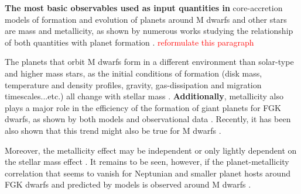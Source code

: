 \documentclass[structabstract]{aa}
\begin{document}
\textbf{The most basic observables used as input quantities in} core-accretion models of formation and evolution of planets around M dwarfs and other stars are mass and metallicity, as shown by numerous works studying the relationship of both quantities with planet formation \citep[e.g.][]{Ida-2005,Kornet-2006, Kennedy-2008a, Thommes-2008, Alibert-2011, Mordasini-2012}. \textcolor{red}{reformulate this paragraph }

The planets that orbit M dwarfs form in a different environment than solar-type and higher mass stars, as the initial conditions of formation (disk mass, temperature and density profiles, gravity, gas-dissipation and migration timescales...etc.) all change with stellar mass \citep[e.g.][]{Ida-2005, Kornet-2006, Kennedy-2008a, Alibert-2011}.  \textbf{Additionally}, metallicity also plays a major role in the efficiency of the formation of giant planets for FGK dwarfs, as shown by both models \citep[e.g.][]{Ida-2004b} and observational data \citep[e.g.][]{Gonzalez-1997,Santos-2004b,Fischer-2005, Mayor-2011}. Recently, it has been also shown that this trend might also be true for M dwarfs \citep[e.g.][]{Bonfils-2007,Johnson-2009, Schlaufman-2010, Rojas-Ayala-2012, Terrien-2012}. 

Moreover, the metallicity effect may be independent or only lightly dependent on the stellar mass effect \citep{Johnson-2010,Alibert-2011}. It remains to be seen, however, if the planet-metallicity correlation that seems to vanish for Neptunian and smaller planet hosts around FGK dwarfs \citep[][Guezzi-2010?]{Sousa-2008,Bouchy-2009,Sousa-2011b} and predicted by models \citep[e.g.][]{Mordasini-2012} is observed around M dwarfs \citep[e.g.][]{Rojas-Ayala-2012,Terrien-2012}.






\end{document}
